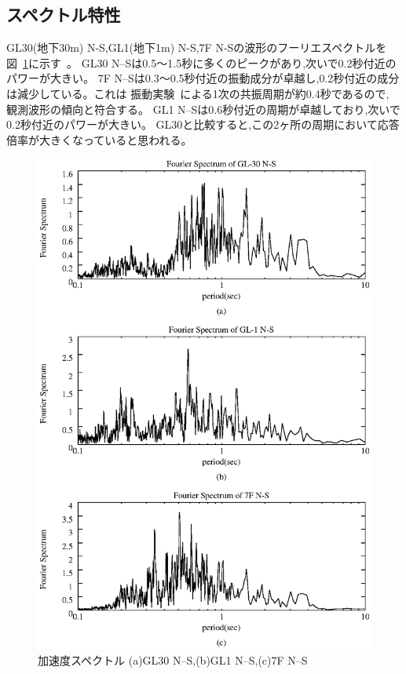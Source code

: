 \documentclass[titlepage]{jsarticle}
\begin{document}
\subsection{スペクトル特性}
GL30(地下30m) N-S,GL1(地下1m) N-S,7F N-Sの波形のフーリエスペクトルを
図~\ref{spec1}に示す~\cite{osaki}。
GL30 N--Sは0.5〜1.5秒に多くのピークがあり,次いで0.2秒付近のパワーが大きい。
7F N--Sは0.3〜0.5秒付近の振動成分が卓越し,0.2秒付近の成分は減少している。これは
振動実験~\cite{jikken}による1次の共振周期が約0.4秒であるので,
観測波形の傾向と符合する。
GL1 N--Sは0.6秒付近の周期が卓越しており,次いで0.2秒付近のパワーが大きい。
GL30と比較すると,この2ヶ所の周期において応答倍率が大きくなっていると思われる。

\begin{figure}[htbp]
\begin{center}
\includegraphics[scale=0.8]{spec.eps}
\caption[加速度スペクトル]{加速度スペクトル (a)GL30 N--S,(b)GL1 N--S,(c)7F N--S}
\label{spec1}
\end{center}
\end{figure}
\end{document}
